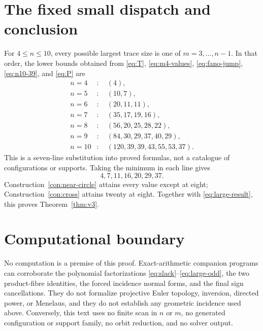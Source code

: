\documentclass[11pt]{article}
\theoremstyle{definition}
\theoremstyle{remark}
\begin{document}
\section{The fixed small dispatch and conclusion}

For \(4\leq n\leq10\), every possible largest trace size is one of
\(m=3,\ldots,n-1\).  In that order, the lower bounds obtained from
\eqref{eq:T}, \eqref{eq:m4-values}, \eqref{eq:fano-jump},
\eqref{eq:n10-39}, and \eqref{eq:P} are
\begin{align*}
 n=4 &: \quad (4),\\
 n=5 &: \quad (10,7),\\
 n=6 &: \quad (20,11,11),\\
 n=7 &: \quad (35,17,19,16),\\
 n=8 &: \quad (56,20,25,28,22),\\
 n=9 &: \quad (84,30,29,37,40,29),\\
 n=10&: \quad (120,39,39,43,55,53,37).
\end{align*}
This is a seven-line substitution into proved formulas, not a catalogue of
configurations or supports.  Taking the minimum in each line gives
\[
 4,7,11,16,20,29,37.
\]
Construction~\ref{con:near-circle} attains every value except at eight;
Construction~\ref{con:cross} attains twenty at eight.  Together with
\eqref{eq:large-result}, this proves Theorem~\ref{thm:v3}.

\section*{Computational boundary}

No computation is a premise of this proof.  Exact-arithmetic companion
programs can corroborate the polynomial factorizations
\eqref{eq:slack}--\eqref{eq:large-odd}, the two product-fibre identities,
the forced incidence normal forms, and the final sign cancellations.  They
do not formalize projective Euler topology, inversion, directed power, or
Menelaus, and they do not establish any geometric incidence used above.
Conversely, this text uses no finite scan in \(n\) or \(m\), no generated
configuration or support family, no orbit reduction, and no solver output.
\end{document}
